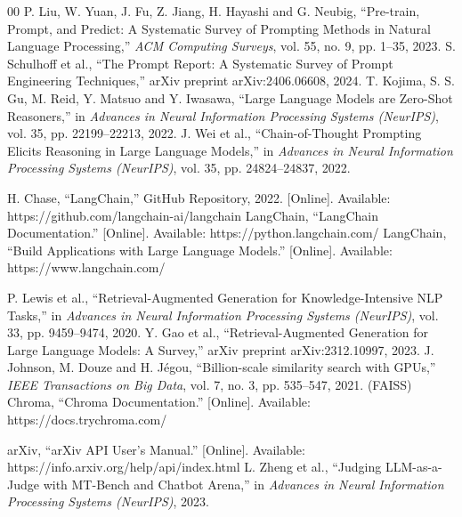 \begin{thebibliography}{00}
 P. Liu, W. Yuan, J. Fu, Z. Jiang, H. Hayashi and G. Neubig, ``Pre-train, Prompt, and Predict: A Systematic Survey of Prompting Methods in Natural Language Processing,'' \textit{ACM Computing Surveys}, vol. 55, no. 9, pp. 1--35, 2023.
 S. Schulhoff et al., ``The Prompt Report: A Systematic Survey of Prompt Engineering Techniques,'' arXiv preprint arXiv:2406.06608, 2024.
 T. Kojima, S. S. Gu, M. Reid, Y. Matsuo and Y. Iwasawa, ``Large Language Models are Zero-Shot Reasoners,'' in \textit{Advances in Neural Information Processing Systems (NeurIPS)}, vol. 35, pp. 22199--22213, 2022.
 J. Wei et al., ``Chain-of-Thought Prompting Elicits Reasoning in Large Language Models,'' in \textit{Advances in Neural Information Processing Systems (NeurIPS)}, vol. 35, pp. 24824--24837, 2022.

 H. Chase, ``LangChain,'' GitHub Repository, 2022. [Online]. Available: https://github.com/langchain-ai/langchain
 LangChain, ``LangChain Documentation.'' [Online]. Available: https://python.langchain.com/
 LangChain, ``Build Applications with Large Language Models.'' [Online]. Available: https://www.langchain.com/

 P. Lewis et al., ``Retrieval-Augmented Generation for Knowledge-Intensive NLP Tasks,'' in \textit{Advances in Neural Information Processing Systems (NeurIPS)}, vol. 33, pp. 9459--9474, 2020.
 Y. Gao et al., ``Retrieval-Augmented Generation for Large Language Models: A Survey,'' arXiv preprint arXiv:2312.10997, 2023.
 J. Johnson, M. Douze and H. J\'egou, ``Billion-scale similarity search with GPUs,'' \textit{IEEE Transactions on Big Data}, vol. 7, no. 3, pp. 535--547, 2021. (FAISS)
 Chroma, ``Chroma Documentation.'' [Online]. Available: https://docs.trychroma.com/

 arXiv, ``arXiv API User's Manual.'' [Online]. Available: https://info.arxiv.org/help/api/index.html
 L. Zheng et al., ``Judging LLM-as-a-Judge with MT-Bench and Chatbot Arena,'' in \textit{Advances in Neural Information Processing Systems (NeurIPS)}, 2023.

\end{thebibliography}